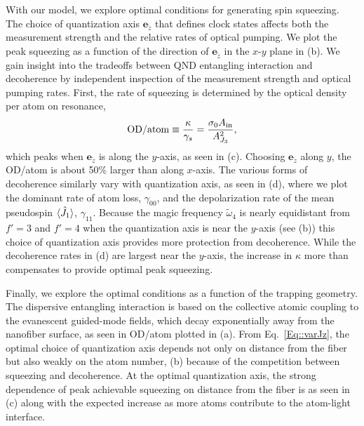 \documentclass[preprint, aps,pra,onecolumn]{revtex4-1} %
\newcommand{\jx}{\hat{J}_1}
\newcommand{\qaxis}{\mathbf{e}_{\tilde{z}}}
\newcommand{\magic}[1]{\tilde{\omega}_{#1}}
\begin{document}
With our model, we explore optimal conditions for generating spin squeezing.   The choice of quantization axis $\qaxis$ that defines clock states affects both the measurement strength and the relative rates of optical pumping. We plot the peak squeezing as a function of the direction of $\qaxis$ in the $x$-$y$ plane in (b). 
We gain insight into the tradeoffs between QND entangling interaction and decoherence by independent inspection of the measurement strength and optical pumping rates.  
First, the rate of squeezing is determined by the optical density per atom on resonance,
\begin{align}\label{Eq::OD/atom}
\mathrm{OD}/\mathrm{atom} \equiv \frac{\kappa}{\gamma_s}=\frac{\sigma_0 A_{\rm in}}{A_{J_3}^2},
\end{align} 
which peaks when $\qaxis$ is along the $y$-axis, as seen in (c). 
Choosing $\qaxis$ along $y$, the OD/atom is about 50\% larger than along $x$-axis.  
The various forms of decoherence similarly vary with quantization axis, as seen in (d), where we plot the dominant rate of atom loss, $\gamma_{00}$, and the depolarization rate of the mean pseudospin $\expt{\jx}$, $\gamma_{11}$. 
Because the magic frequency $\magic{4}$ is nearly equidistant from $f'=3$ and $f'=4$ when the quantization  axis is near the $y$-axis (see (b)) this choice of quantization axis provides more protection from decoherence.   
While the decoherence rates in (d) are largest near the $y$-axis, the increase in $\kappa$ more than compensates to provide optimal peak squeezing.

Finally, we explore the optimal conditions as a function of the trapping geometry.  
The dispersive entangling interaction is based on the collective atomic coupling to the evanescent guided-mode fields, which decay exponentially away from the nanofiber surface, as seen in OD/atom plotted in (a). 
From Eq.~\eqref{Eq::varJz}, the optimal choice of quantization axis depends not only on distance from the fiber but also weakly on the atom number, (b) because of the competition between squeezing and decoherence.  
At the optimal quantization axis, the strong dependence of peak achievable squeezing on distance from the fiber is as seen in (c) along with the expected increase as more atoms contribute to the atom-light interface.  
\end{document}
